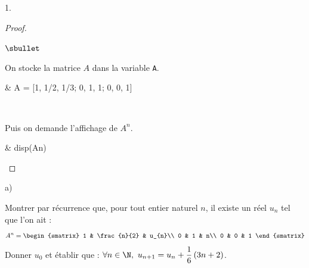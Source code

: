 \documentclass[11pt]{article}%
\begin{document}
\begin{noliste}{1.}
  \begin{proof}~%
    \begin{noliste}{$\sbullet$}
    \item On stocke la matrice $A$ dans la variable {\tt A}.\\
      \begin{scilabC}{1}
        & A = [1, 1/2, 1/3; 0, 1, 1; 0, 0, 1]
      \end{scilabC}~

    \item Puis on demande l'affichage de $A^n$.
      \begin{scilabC}{2}
        & disp(A\puis{}n)
      \end{scilabC}
    \end{noliste}
  \end{proof}




\item
  \begin{noliste}{a)}
    \setlength{\itemsep}{2mm}
  \item Montrer par récurrence que, pour tout entier naturel $n$, il
    existe un réel $u_{n}$ tel que l'on ait :
    \[
    A^{n} = 
    \begin{smatrix}
      1 & \frac{n}{2} & u_{n}\\
      0 & 1 & n\\
      0 & 0 & 1
    \end{smatrix}
    \]
    Donner $u_{0}$ et établir que : $\forall n \in \N, \ u_{n + 1} =
    u_{n} + \dfrac{1}{6}\left(3n + 2\right)$.
    

\end{noliste}
\end{noliste}
\end{document}
